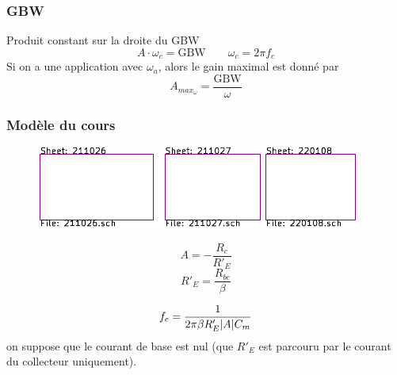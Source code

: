 \documentclass[resume]{subfiles}
\begin{document}
\begin{multicols}{3}
\subsubsection{GBW}
Produit constant sur la droite du GBW
$$A\cdot \omega_c = \text{GBW}\qquad \omega_c=2\pi f_c$$
Si on a une application avec $\omega_a$, alors le gain maximal est donné par
$$A_{max_\omega}=\frac{\text{GBW}}{\omega}$$
\subsubsection{Modèle du cours}
\begin{figure}[H]
\centering
\includegraphics[scale=1,page=10]{../KiCad/resume-crop.pdf}
\end{figure}
$$A=-\frac{R_c}{R'_E}$$
$$R'_E=\frac{R_{be}}{\beta}$$

$$f_c=\frac{1}{2\pi \beta R'_E \abs{A} C_m}$$
on suppose que le courant de base est nul (que $R'_E$ est parcouru par le courant du collecteur uniquement).
\end{multicols}
\end{document}
